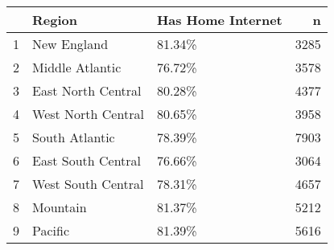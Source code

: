 \begin{table}[ht]
\centering
\begin{tabular}{rllr}
  \hline
 & Region & Has Home Internet & n \\ 
  \hline
1 & New England & 81.34\% & 3285 \\ 
  2 & Middle Atlantic & 76.72\% & 3578 \\ 
  3 & East North Central & 80.28\% & 4377 \\ 
  4 & West North Central & 80.65\% & 3958 \\ 
  5 & South Atlantic & 78.39\% & 7903 \\ 
  6 & East South Central & 76.66\% & 3064 \\ 
  7 & West South Central & 78.31\% & 4657 \\ 
  8 & Mountain & 81.37\% & 5212 \\ 
  9 & Pacific & 81.39\% & 5616 \\ 
   \hline
\end{tabular}
\end{table}
